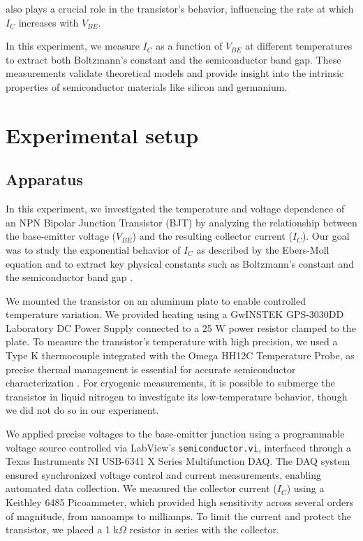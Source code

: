 \documentclass[12pt,letterpaper,twocolumn]{article}
\begin{document}
also plays a crucial role in the transistor’s behavior, influencing the rate at which \( I_C \) increases with \( V_{BE} \)\cite{Collings}.

In this experiment, we measure \( I_C \) as a function of \( V_{BE} \) at different temperatures to extract both Boltzmann’s constant and the semiconductor band gap. These measurements validate theoretical models and provide insight into the intrinsic properties of semiconductor materials like silicon and germanium.



\section{Experimental setup}


\subsection{Apparatus}

In this experiment, we investigated the temperature and voltage dependence of an NPN Bipolar Junction Transistor (BJT) by analyzing the relationship between the base-emitter voltage (\( V_{BE} \)) and the resulting collector current (\( I_C \)). Our goal was to study the exponential behavior of \( I_C \) as described by the Ebers-Moll equation and to extract key physical constants such as Boltzmann’s constant and the semiconductor band gap \cite{Neudeck}.

We mounted the transistor on an aluminum plate to enable controlled temperature variation. We provided heating using a GwINSTEK GPS-3030DD Laboratory DC Power Supply connected to a 25 W power resistor clamped to the plate. To measure the transistor’s temperature with high precision, we used a Type K thermocouple integrated with the Omega HH12C Temperature Probe, as precise thermal management is essential for accurate semiconductor characterization \cite{Grundmann}. For cryogenic measurements, it is possible to submerge the transistor in liquid nitrogen to investigate its low-temperature behavior, though we did not do so in our experiment.

We applied precise voltages to the base-emitter junction using a programmable voltage source controlled via LabView’s \texttt{semiconductor.vi}, interfaced through a Texas Instruments NI USB-6341 X Series Multifunction DAQ. The DAQ system ensured synchronized voltage control and current measurements, enabling automated data collection. We measured the collector current (\( I_C \)) using a Keithley 6485 Picoammeter, which provided high sensitivity across several orders of magnitude, from nanoamps to milliamps. To limit the current and protect the transistor, we placed a 1 k\(\Omega\) resistor in series with the collector.
\end{document}
